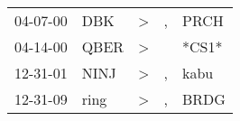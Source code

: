 \begin{supertabular}{p{0.07\textwidth}p{0.06\textwidth}p{0.02\textwidth}p{0.02\textwidth}p{0.06\textwidth}}
 04-07-00\textsuperscript{} &   DBK\textsuperscript{} &  \textgreater &  , &  PRCH\textsuperscript{} \\
 04-14-00\textsuperscript{} &  QBER\textsuperscript{} &  \textgreater &    &                   *CS1* \\
 12-31-01\textsuperscript{} &  NINJ\textsuperscript{} &  \textgreater &  , &  kabu\textsuperscript{} \\
 12-31-09\textsuperscript{} &  ring\textsuperscript{} &  \textgreater &  , &  BRDG\textsuperscript{} \\
\end{supertabular}
